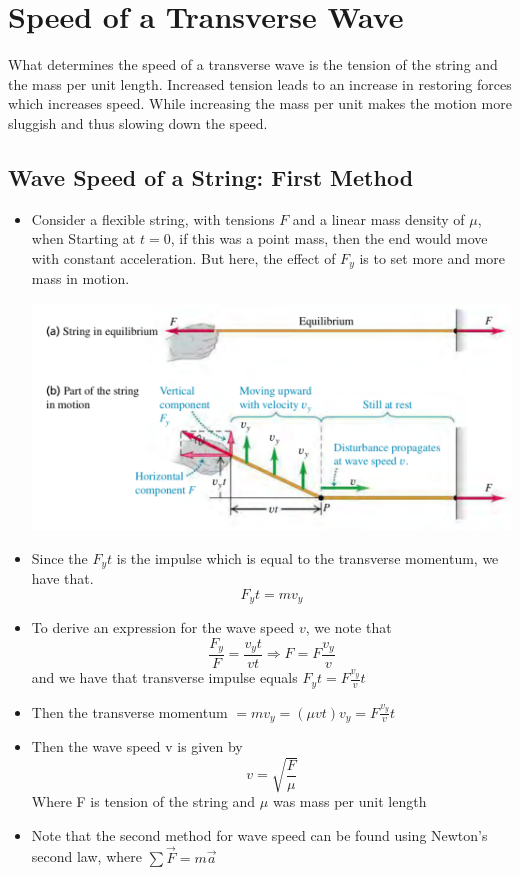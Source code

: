 \documentclass[11pt, a4paper]{article}
\begin{document}
\section[15.4, Speed of a Tranverse Wave]{Speed of a Transverse Wave}
What determines the speed of a transverse wave is the tension of the string and the mass per unit
length. Increased tension leads to an increase in restoring forces which increases speed. While
increasing the mass per unit makes the motion more sluggish and thus slowing down the speed.

\subsection{Wave Speed of a String: First Method}
\begin{itemize}
    \item Consider a flexible string, with tensions $F$ and a linear mass density of $\mu$, when
        Starting at $t=0$, if this was a point mass, then the end would move with constant acceleration.
        But here, the effect of $F_y$ is to set more and more mass in motion.

        \includegraphics[scale=0.65]{images/string_transverse.png}

    \item Since the $F_{y}t$ is the impulse which is equal to the transverse momentum, we have that.
        \begin{equation}
            F_{y}t = mv_y
        \end{equation}
    \item To derive an expression for the wave speed $v$, we note that
        \begin{equation}
            \frac{F_y}{F} = \frac{v_{y}t}{vt} \Rightarrow F = F\frac{v_y}{v}
        \end{equation}
        and we have that transverse impulse equals $F_{y}t = F\frac{v_{y}}{v}t$
    \item Then the transverse momentum $= mv_y = (\mu vt)v_y = F\frac{v_{y}}{v}t$
    \item Then the wave speed v is given by
        \begin{equation}
            v = \sqrt{\frac{F}{\mu}}
        \end{equation}
        Where F is tension of the string and $\mu$ was mass per unit length
    \item Note that the second method for wave speed can be found using Newton's second law, where
        $\sum \vec{F} = m\vec{a}$
\end{itemize}
\end{document}
